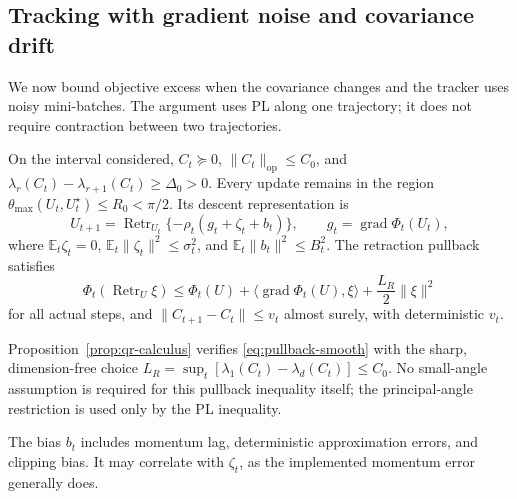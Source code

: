 \subsection{Tracking with gradient noise and covariance drift}
\label{app:tracking}

We now bound objective excess when the covariance changes and the tracker
uses noisy mini-batches. The argument uses PL along one trajectory;
it does not require contraction between two trajectories.

\begin{assumption}
\label{ass:tracking}
On the interval considered, $C_t\succeq0$,
$\|C_t\|_{\mathrm{op}}\le C_0$, and
$\lambda_r(C_t)-\lambda_{r+1}(C_t)\ge\Delta_0>0$.
Every update remains in the region
$\theta_{\max}(U_t,U_t^\star)\le R_0<\pi/2$.
Its descent representation is
\begin{equation}
 U_{t+1}=\operatorname{Retr}_{U_t}\{-\rho_t(g_t+\zeta_t+b_t)\},
 \qquad g_t=\operatorname{grad}\Phi_t(U_t),\label{eq:tracking-update}
\end{equation}
where $\mathbb E_t\zeta_t=0$,
$\mathbb E_t\|\zeta_t\|^2\le\sigma_t^2$, and
$\mathbb E_t\|b_t\|^2\le B_t^2$.
The retraction pullback satisfies
\begin{equation}
 \Phi_t(\operatorname{Retr}_U\xi)
 \le\Phi_t(U)+\langle\operatorname{grad}\Phi_t(U),\xi\rangle
                    +\frac{L_R}{2}\|\xi\|^2\label{eq:pullback-smooth}
\end{equation}
for all actual steps, and
$\|C_{t+1}-C_t\|\le v_t$ almost surely, with deterministic $v_t$.
\end{assumption}

Proposition~\ref{prop:qr-calculus} verifies \eqref{eq:pullback-smooth}
with the sharp, dimension-free choice
$L_R=\sup_t[\lambda_1(C_t)-\lambda_d(C_t)]\le C_0$.
No small-angle assumption is required for this pullback inequality itself;
the principal-angle restriction is used only by the PL inequality.

The bias $b_t$ includes momentum lag, deterministic approximation errors,
and clipping bias. It may correlate with $\zeta_t$, as the implemented
momentum error generally does.

